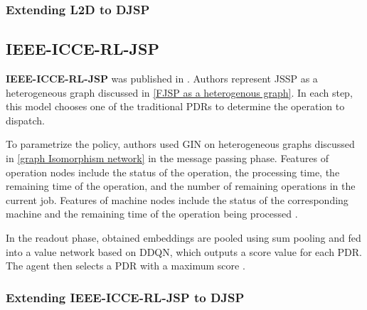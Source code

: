 \subsubsection{Extending L2D to DJSP}


\subsection{IEEE-ICCE-RL-JSP}

\textbf{IEEE-ICCE-RL-JSP} was published in \cite{10226873}. Authors represent JSSP as a heterogeneous graph discussed in \ref{FJSP as a heterogenous graph}. In each step, this model chooses one of the traditional PDRs to determine the operation to dispatch.
\par
To parametrize the policy, authors used GIN on heterogeneous graphs discussed in \ref{graph Isomorphism network} in the message passing phase. Features of operation nodes include the status of the operation, the processing time, the remaining time of the operation, and the number of remaining operations in the current job. Features of machine nodes include the status of the corresponding machine and the remaining time of the operation being processed \cite{10226873}.
\par
In the readout phase, obtained embeddings are pooled using sum pooling and fed into a value network based on DDQN, which outputs a score value for each PDR. The agent then selects a PDR with a maximum score \cite{10226873}.

\subsubsection{Extending IEEE-ICCE-RL-JSP to DJSP}

